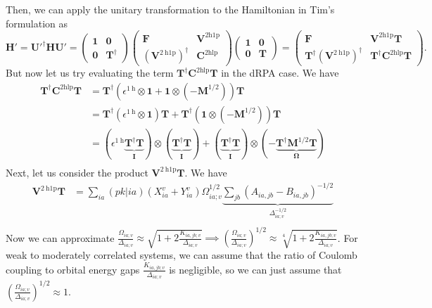 Then, we can apply the unitary transformation to the Hamiltonian in Tim's formulation as
\begin{equation}
    \bm{H'} = \bm{U'}^\dag \bm{H} \bm{U'} = \begin{pmatrix} \bm{1} & \bm{0}\\ \bm{0}&\bm{T }^\dag \end{pmatrix} \begin{pmatrix} \bm{F} & \bm{V}^{2 \mathrm{h1p}}\\ \left(\bm{V}^{2 \mathrm{~h} 1 \mathrm{p}}\right)^{\dagger} & \bm{C}^{2 \mathrm{hlp}} \end{pmatrix} \begin{pmatrix} \bm{1} & \bm{0} \\ \bm{0}&\bm{T } \end{pmatrix} = \begin{pmatrix} \bm{F} & \bm{V}^{2 \mathrm{h1p}}\bm{T}\\ \bm{T}^\dag \left(\bm{V}^{2 \mathrm{~h} 1 \mathrm{p}}\right)^{\dagger} & \bm{T }^\dagger \bm{C}^{2 \mathrm{hlp}} \bm{T } \end{pmatrix}.
\label{eq:tim_upfolded_hamiltonian}
\end{equation}
But now let us try evaluating the term $\bm{T}^\dagger \bm{C}^{2 \mathrm{hlp}} \bm{T }$ in the dRPA case. We have
\begin{align}
    \bm{T}^\dagger \bm{C}^{2 \mathrm{hlp}} \bm{T } &= \bm{T}^\dagger \left(\epsilon^{1 \mathrm{~h}} \otimes \bm{1} + \bm{1} \otimes (-\bm{M}^{1/2})\right) \bm{T } \\
&= \bm{T}^\dagger \left(\epsilon^{1 \mathrm{~h}} \otimes \bm{1}\right) \bm{T } + \bm{T}^\dagger \left(\bm{1} \otimes (-\bm{M}^{1/2})\right) \bm{T } \\
&= \left(\epsilon^{1 \mathrm{~h}} \underbrace{\bm{T}^\dag \bm{T}}_{\bm{\bm{I}}} \right) \otimes \left(\underbrace{\bm{T}^\dag \bm{T}}_{\bm{\bm{I}}}\right) + \left(\underbrace{\bm{T}^\dag \bm{T}}_{\bm{\bm{I}}}\right) \otimes (-\underbrace{\bm{T}^\dag \bm{M}^{1/2} \bm{T}}_{\bm{\Omega }}) \\
\end{align}
Next, let us consider the product $\bm{V}^{2 \mathrm{~h} 1 \mathrm{p}} \bm{T }$. We have
\begin{align}
    \bm{V}^{2 \mathrm{~h} 1 \mathrm{p}} \bm{T } &= \sum_{ia} (pk|ia) \left( X_{ia}^{v} + Y_{ia}^{v} \right) \Omega_{ia;v}^{1/2} \underbrace{\sum_{jb} \left(A_{ia,jb} - B_{ia,jb}\right)^{-1/2}}_{\Delta _{ia;v}^{-1/2}} \\
\end{align}
Now we can approximate $\frac{\Omega _{ia;v}}{\Delta _{ia;v}} \approx \sqrt{1+2\frac{K_{ia,jb; v}}{\Delta _{ia;v}}} \implies \left(\frac{\Omega _{ia;v}}{\Delta _{ia;v}}\right)^{1/2} \approx \sqrt[4]{1 + 2\frac{K_{ia,jb;v}}{\Delta _{ia;v}}}$. For weak to moderately correlated systems, we can assume that the ratio of Coulomb coupling to orbital energy gaps $\frac{K_{ia,jb;v}}{\Delta _{ia;v}}$
is negligible, so we can just assume that $\left(\frac{\Omega _{ia;v}}{\Delta _{ia;v}}\right)^{1/2} \approx 1$. 
